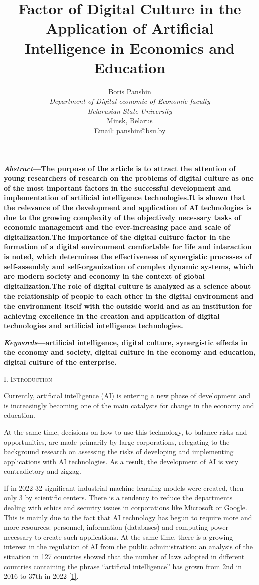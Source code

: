 \documentclass{article}
\title{\textbf{Factor of Digital Culture in the Application of
Artificial Intelligence in Economics and
Education}}
\author{Boris Panshin \\ \textit{ Department of Digital economic of Economic faculty} \\ \textit{Belarusian State University} \\ Minsk, Belarus \\ Email: \href{mailto: panshin@bsu.by}{panshin@bsu.by}}
\date{}
\begin{document}
\maketitle
\begin{multicols}{2}
    \textbf{\textit{Abstract}—The purpose of the article is to attract the
attention of young researchers of research on the problems
of digital culture as one of the most important factors in
the successful development and implementation of artificial
intelligence technologies.It is shown that the relevance of
the development and application of AI technologies is due
to the growing complexity of the objectively necessary tasks
of economic management and the ever-increasing pace and
scale of digitalization.The importance of the digital culture
factor in the formation of a digital environment comfortable
for life and interaction is noted, which determines the
effectiveness of synergistic processes of self-assembly and
self-organization of complex dynamic systems, which are
modern society and economy in the context of global
digitalization.The role of digital culture is analyzed as a
science about the relationship of people to each other in
the digital environment and the environment itself with the
outside world and as an institution for achieving excellence
in the creation and application of digital technologies and
artificial intelligence technologies.}

\textbf{\textit{Keywords}—artificial intelligence, digital culture, synergistic effects in the economy and society, digital culture in the economy and education, digital culture of the enterprise.}
\begin{center}
\vspace{-5pt}
    \large{\textsc{I. Introduction}}
    \vspace{-5pt}
\end{center}

Currently, artificial intelligence (AI) is entering a new
phase of development and is increasingly becoming one
of the main catalysts for change in the economy and
education.

At the same time, decisions on how to use this
technology, to balance risks and opportunities, are made
primarily by large corporations, relegating to the background research on assessing the risks of developing and implementing applications with AI technologies. As a
result, the development of AI is very contradictory and
zigzag.

If in 2022 32 significant industrial machine learning
models were created, then only 3 by scientific centers. There is a tendency to reduce the departments dealing with ethics and security issues in corporations
like Microsoft or Google. This is mainly due to the
fact that AI technology has begun to require more and
more resources: personnel, information (databases) and computing power necessary to create such applications. At the same time, there is a growing interest in the
regulation of AI from the public administration: an
analysis of the situation in 127 countries showed that the
number of laws adopted in different countries containing
the phrase “artificial intelligence” has grown from 2nd
in 2016 to 37th in 2022 \href{https://www.mckinsey.com}{[1]}.


\end{multicols}
\end{document}
